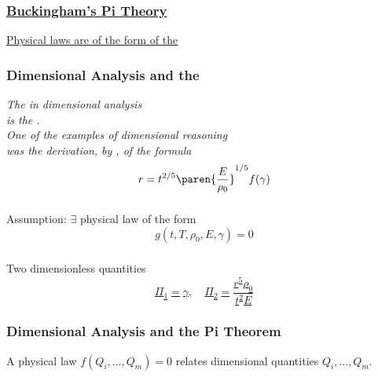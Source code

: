 %
\begin{frame}\frametitle{\href{https://scienceworld.wolfram.com/physics/BuckinghamsPiTheorem.html}{Buckingham's Pi Theory}}
\center
\href{https://en.wikipedia.org/wiki/Buckingham_\%CF\%80_theorem}{
Physical laws are  of the form of the 
}
\end{frame}
%
%
\begin{frame}\frametitle{Dimensional Analysis and the }
\center
	\href{https://www.sciencedirect.com/science/article/pii/0024379582902294}{
	\begin{overpic}[ scale = 0.75 ]
		{\pLocalGraphics curtis-pi-03}
	\end{overpic}}
	\ \\
	\cite{curtis1982dimensional}
\end{frame}
%
\begin{frame}\frametitle{Dimensional Analysis and the }
\center
	\emph{The  in dimensional analysis\\ is the .}\\[20pt]
	\pause
	\emph{One of the  examples of dimensional reasoning\\ was the derivation, by , of the formula}
\begin{equation}
	r= t^{2/5}\paren{\frac{E}{\rho_{0}}}^{1/5} f(\gamma)
\label{eq:curtis-example}
\end{equation}
\end{frame}
%
\begin{frame}\frametitle{\pititle}
\center 
Assumption: $\exists$ physical law of the form 
\begin{equation}
	g(t, T, \rho_{0}, E, \gamma) = 0
\label{eq:curtis-Assumption}
\end{equation}
\end{frame}
%
\begin{frame}\frametitle{\pititle}
\center 
Two dimensionless quantities
\href{https://pdf.sciencedirectassets.com/271586/1-s2.0-S0024379500X02728/1-s2.0-0024379582902294/main.pdf\#page=2}{
\begin{equation}
	\Pi_{1} = \gamma, \quad \Pi_{2} = \frac{r^{5}\rho_{0}} {t^{2} E}
\label{eq:pi}
\end{equation}
}
\end{frame}
%
%
\begin{frame}\frametitle{Dimensional Analysis and the Pi Theorem}
	\begin{definition}
		A physical law  $f( Q_{i}, . . . , Q_{m}) = 0$ relates dimensional quantities $Q_{i}, . . . , Q_{m}$. 
	\end{definition}
\end{frame}
